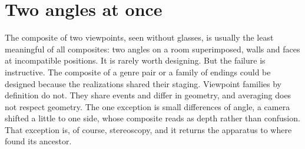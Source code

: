 \section{Two angles at once}

The composite of two viewpoints, seen without glasses, is usually the least meaningful of all composites: two angles on a room superimposed, walls and faces at incompatible positions. It is rarely worth designing. But the failure is instructive. The composite of a genre pair or a family of endings could be designed because the realizations shared their staging. Viewpoint families by definition do not. They share events and differ in geometry, and averaging does not respect geometry. The one exception is small differences of angle, a camera shifted a little to one side, whose composite reads as depth rather than confusion. That exception is, of course, stereoscopy, and it returns the apparatus to where  found its ancestor.
